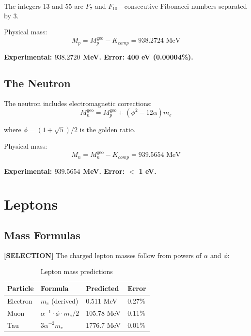 \documentclass[aps,prd,twocolumn,10pt,groupedaddress,superscriptaddress]{revtex4-2}
\begin{document}
The integers 13 and 55 are $F_7$ and $F_{10}$---consecutive Fibonacci numbers separated by 3.

Physical mass:
\begin{equation}
M_p = M_p^{\text{geo}} - K_{comp} = 938.2724 \text{ MeV}
\end{equation}

\textbf{Experimental: $938.2720$ MeV. Error: 400 eV (0.00004\%).}

\subsection{The Neutron}

The neutron includes electromagnetic corrections:
\begin{equation}
M_n^{\text{geo}} = M_p^{\text{geo}} + (\phi^2 - 12\alpha)m_e
\end{equation}

where $\phi = (1+\sqrt{5})/2$ is the golden ratio.

Physical mass:
\begin{equation}
M_n = M_n^{\text{geo}} - K_{comp} = 939.5654 \text{ MeV}
\end{equation}

\textbf{Experimental: $939.5654$ MeV. Error: $<$ 1 eV.}

\section{Leptons}

\subsection{Mass Formulas}

\textbf{[SELECTION]} The charged lepton masses follow from powers of $\alpha$ and $\phi$:

\begin{table}[h]
\caption{Lepton mass predictions}
\begin{ruledtabular}
\begin{tabular}{llll}
Particle & Formula & Predicted & Error \\
\hline
Electron & $m_e$ (derived) & 0.511 MeV & 0.27\% \\
Muon & $\alpha^{-1} \cdot \phi \cdot m_e / 2$ & 105.78 MeV & 0.11\% \\
Tau & $3\alpha^{-2} m_e$ & 1776.7 MeV & 0.01\% \\
\end{tabular}
\end{ruledtabular}
\end{table}
\end{document}
